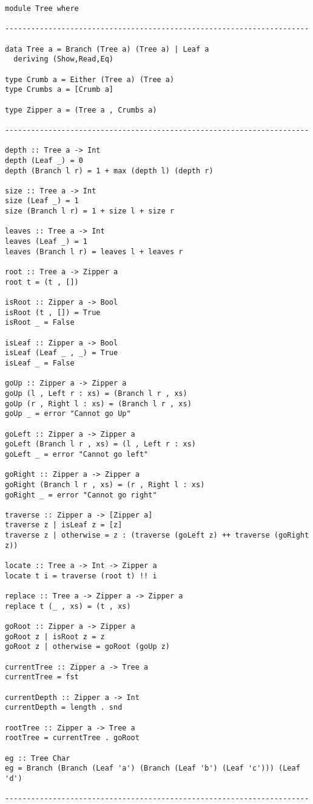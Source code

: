 \documentclass{article}
\begin{document}
\begin{lstlisting}
module Tree where

----------------------------------------------------------------------

data Tree a = Branch (Tree a) (Tree a) | Leaf a
  deriving (Show,Read,Eq)

type Crumb a = Either (Tree a) (Tree a)
type Crumbs a = [Crumb a]

type Zipper a = (Tree a , Crumbs a)

----------------------------------------------------------------------

depth :: Tree a -> Int
depth (Leaf _) = 0
depth (Branch l r) = 1 + max (depth l) (depth r)

size :: Tree a -> Int
size (Leaf _) = 1
size (Branch l r) = 1 + size l + size r

leaves :: Tree a -> Int
leaves (Leaf _) = 1
leaves (Branch l r) = leaves l + leaves r

root :: Tree a -> Zipper a
root t = (t , [])

isRoot :: Zipper a -> Bool
isRoot (t , []) = True
isRoot _ = False

isLeaf :: Zipper a -> Bool
isLeaf (Leaf _ , _) = True
isLeaf _ = False

goUp :: Zipper a -> Zipper a
goUp (l , Left r : xs) = (Branch l r , xs)
goUp (r , Right l : xs) = (Branch l r , xs)
goUp _ = error "Cannot go Up"

goLeft :: Zipper a -> Zipper a
goLeft (Branch l r , xs) = (l , Left r : xs)
goLeft _ = error "Cannot go left"

goRight :: Zipper a -> Zipper a
goRight (Branch l r , xs) = (r , Right l : xs)
goRight _ = error "Cannot go right"

traverse :: Zipper a -> [Zipper a]
traverse z | isLeaf z = [z]
traverse z | otherwise = z : (traverse (goLeft z) ++ traverse (goRight z))

locate :: Tree a -> Int -> Zipper a
locate t i = traverse (root t) !! i

replace :: Tree a -> Zipper a -> Zipper a
replace t (_ , xs) = (t , xs)

goRoot :: Zipper a -> Zipper a
goRoot z | isRoot z = z
goRoot z | otherwise = goRoot (goUp z)

currentTree :: Zipper a -> Tree a
currentTree = fst

currentDepth :: Zipper a -> Int
currentDepth = length . snd

rootTree :: Zipper a -> Tree a
rootTree = currentTree . goRoot

eg :: Tree Char
eg = Branch (Branch (Leaf 'a') (Branch (Leaf 'b') (Leaf 'c'))) (Leaf 'd')

----------------------------------------------------------------------
\end{lstlisting}
\end{document}
